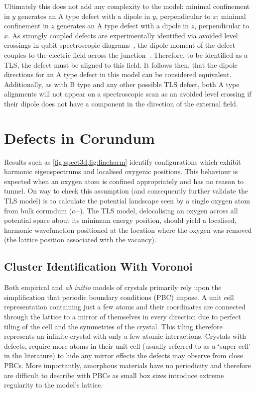 Ultimately this does not add any complexity to the model: minimal confinement in $y$ generates an A type defect with a dipole in $y$, perpendicular to $x$; minimal confinement in $z$ generates an A type defect with a dipole in $z$, perpendicular to $x$.
As strongly coupled defects are experimentally identified via avoided level crossings in qubit spectroscopic diagrams~\cite{Lisenfeld2010}, the dipole moment of the defect couples to the electric field across the junction~\cite{Martinis2005}.
Therefore, to be identified as a TLS, the defect must be aligned to this field.
It follows then, that the dipole directions for an A type defect in this model can be considered equivalent.
Additionally, as with B type and any other possible TLS defect, both A type alignments will not appear on a spectroscopic scan as an avoided level crossing if their dipole does not have a component in the direction of the external field.

\section{Defects in Corundum}\label{sec:corundum}

Results such as \cref{fig:spect3d,fig:lineharm} identify configurations which exhibit harmonic eigenspectrums and localised oxygenic positions.
This behaviour is expected when an oxygen atom is confined appropriately and has no reason to tunnel.
On way to check this assumption (and consequently further validate the TLS model) is to calculate the potential landscape seen by a single oxygen atom from bulk corundum ($\alpha$--).
The TLS model, delocalising an oxygen across all potential space about its minimum energy position, should yield a localised, harmonic wavefunction positioned at the location where the oxygen was removed (\ie the lattice position associated with the vacancy).

\subsection{Cluster Identification With Voronoi}\label{sec:voronoi}

Both empirical and \textit{ab initio} models of crystals primarily rely upon the simplification that periodic boundary conditions (PBC) impose.
A unit cell representation containing just a few atoms and their coordinates are connected through the lattice to a mirror of themselves in every direction due to perfect tiling of the cell and the symmetries of the crystal.
This tiling therefore represents an infinite crystal with only a few atomic interactions.
Crystals with defects, require more atoms in their unit cell (usually referred to as a `super cell' in the literature) to hide any mirror effects the defects may observe from close PBCs.
More importantly, amorphous materials have no periodicity and therefore are difficult to describe with PBCs as small box sizes introduce extreme regularity to the model's lattice.

